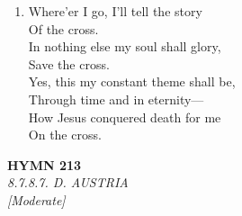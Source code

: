 \documentclass[11pt,a4paper]{article}
\begin{document}
\begin{enumerate}
    \item Where'er I go, I'll tell the story \\
            Of the cross. \\
        In nothing else my soul shall glory, \\
            Save the cross. \\
        Yes, this my constant theme shall be, \\
        Through time and in eternity--- \\
        How Jesus conquered death for me \\
            On the cross.

\end{enumerate}

\newpage
\begin{center}
    {\Large \textbf{HYMN 213}}
    \\
    \textit{8.7.8.7. D. AUSTRIA}
    \\
    \textit{\small [Moderate]}
\end{center}
\vspace{1em}
\end{document}
